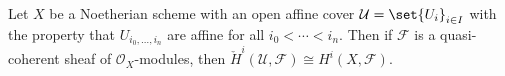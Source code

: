 Let $X$ be a Noetherian scheme with an open affine cover $\mathcal{U} = \set{U_i}_{i \in I}$
with the property that $U_{i_0, \ldots, i_n}$ are affine for all $i_0 < \cdots < i_n$.
Then if $\mathcal{F}$ is a quasi-coherent sheaf of $\mathcal{O}_X$-modules, then
$\check{H}^i(\mathcal{U}, \mathcal{F}) \cong H^i(X, \mathcal{F})$.
